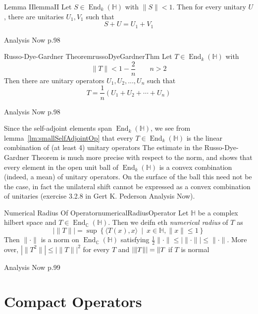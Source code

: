 \documentclass[oneside]{book}
\newcommand{\C}{\mathbb{C}}
\renewcommand{\H}{\mathbb{H}}
\newcommand{\End}{\operatorname{End}}
\newcommand{\set}[2]{\left\{#1 \ \middle|\ #2\right\}}
\begin{document}
\begin{lem}{Lemma II}{lemmaII}
	Let $S \in \End_k(\H)$ with $\|S\| < 1$. Then for every unitary $U$, there are unitaries $U_1, V_1$ such that
	\[
		S+U = U_1 + V_1
	\]
\end{lem}

\begin{Proof}
	Analysis Now p.98
\end{Proof}

\begin{thm}{Russo-Dye-Gardner
Theorem}{russoDyeGardnerThm}
	Let $T \in \End_k(\H)$ with
	\[
		\|T\| < 1 - \frac{2}{n} \qquad n > 2
	\]
	Then there are unitary operators $U_1, U_2, ..., U_n$ such that
	\[
		T = \frac{1}{n}(U_1+ U_2+ \cdots + U_n)
	\]
\end{thm}

\begin{Proof}
	Analysis Now p.98
\end{Proof}

Since the self-adjoint elements span $\End_k(\H)$, we see from lemma~\ref{lm:smallSelfAdjointOp} that every $T \in
\End_k(\H)$ is the linear combination of (at least 4) unitary operators The estimate in the Russo-Dye-Gardner Theorem
is much more precise with respect to the norm, and shows that every element in the open unit ball of $\End_k(\H)$ is
a convex combination (indeed, a mean) of unitary operators. On the surface of the ball this need not be the case, in
fact the unilateral shift cannot be expressed as a convex combination of unitaries (exercise 3.2.8 in Gert K.
Pederson Analysis Now).

\begin{prop}{Numerical Radius Of Operator}{numericalRadiusOperator}
	Let $\H$ be a complex hilbert space and $T \in \End_\C(\H)$. Then we deifn eth \emph{numerical radius} of $T$ as
	\[
		|\|T\|| = \sup \set{ \langle T(x), x \rangle }{ x \in \H, \|x\| \le 1 }
	\]
	Then $\|\cdot\|$ is a norm on $\End_\C(\H)$ satisfying $\frac{1}{2}\|\cdot\| \le |\|\cdot\||
	\le \|\cdot\|$. More over, $|\|T^2\|| \le |\|T\||^2$ for every $T$ and $|\|T\|| = \|T\\$ if $T$ is normal
\end{prop}

\begin{Proof}
	Analysis Now p.99
\end{Proof}

\section{Compact Operators}\label{sec:compOp}
\end{document}

